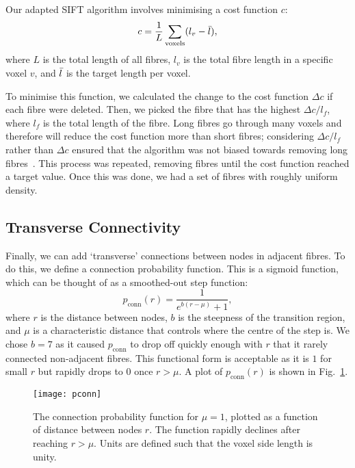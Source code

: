 Our adapted SIFT algorithm involves minimising a cost function $c$:
\begin{equation}
    c = \frac{1}{L} \sum_{\mathrm{voxels}} (l_v - \Bar{l}),
\end{equation}
where $L$ is the total length of all fibres, $l_v$ is the total fibre length in a specific voxel $v$, and $\Bar{l}$ is the target length per voxel. 

To minimise this function, we calculated the change to the cost function $\Delta c$ if each fibre were deleted. Then, we picked the fibre that has the highest $\Delta c / l_f$, where $l_f$ is the total length of the fibre. Long fibres go through many voxels and therefore will reduce the cost function more than short fibres; considering $\Delta c / l_f$ rather than $\Delta c$ ensured that the algorithm was not biased towards removing long fibres~\cite{sift}. This process was repeated, removing fibres until the cost function reached a target value. Once this was done, we had a set of fibres with roughly uniform density.

\subsection{Transverse Connectivity}

Finally, we can add `transverse' connections between nodes in adjacent fibres. To do this, we define a connection probability function. This is a sigmoid function, which can be thought of as a smoothed-out step function:
\begin{equation}
    p_\text{conn}(r) = \frac{1}{e^{b(r - \mu)} + 1},
    \label{eq:pconn}
\end{equation}
where $r$ is the distance between nodes, $b$ is the steepness of the transition region, and $\mu$ is a characteristic distance that controls where the centre of the step is. We chose $b = 7$ as it caused $p_\text{conn}$ to drop off quickly enough with $r$ that it rarely connected non-adjacent fibres.
This functional form is acceptable as it is $1$ for small $r$ but rapidly drops to $0$ once $r > \mu$.
A plot of $p_\text{conn}(r)$ is shown in Fig.~\ref{fig:pconn}.

\begin{figure}[h] \begin{mdframed}
    \centering
    \texttt{[image: pconn]}
    \caption{The connection probability function for $\mu=1$, plotted as a function of distance between nodes $r$. The function rapidly declines after reaching $r > \mu$. Units are defined such that the voxel side length is unity.}
    \label{fig:pconn}
\end{mdframed} \end{figure}

